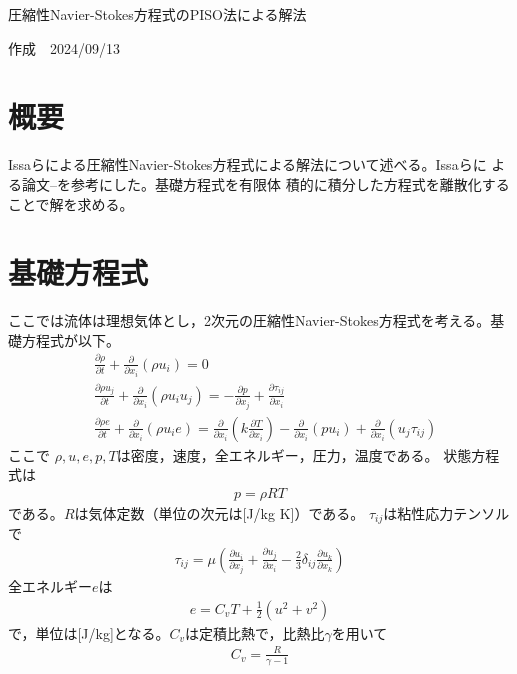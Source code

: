 \documentclass[a4paper,10pt,fleqn]{jsarticle}
\begin{document}

\begin{flushleft}
\begin{Large}
圧縮性Navier-Stokes方程式のPISO法による解法
\end{Large}
\end{flushleft}

\begin{flushright}
作成　2024/09/13\\
\end{flushright}

\section{概要}
Issaらによる圧縮性Navier-Stokes方程式による解法について述べる。Issaらに
よる論文\cite{Issa1991}--\cite{Issa1986}を参考にした。基礎方程式を有限体
積的に積分した方程式を離散化することで解を求める。

\section{基礎方程式}
ここでは流体は理想気体とし，2次元の圧縮性Navier-Stokes方程式を考える。基礎方程式が以下。
\begin{align}
& \frac{\partial \rho}{\partial t} + \frac{\partial}{\partial x_i}(\rho
 u_i) = 0 \label{eq:mass0}\\
& \frac{\partial \rho u_j}{\partial t} + \frac{\partial}{\partial x_i}(\rho
 u_i u_j) = -\frac{\partial p}{\partial x_j} + \frac{\partial
 \tau_{ij}}{\partial x_i} \label{eq:mom0}\\
& \frac{\partial \rho e}{\partial t} + \frac{\partial}{\partial x_i}(\rho
 u_i e) = \frac{\partial}{\partial x_i}\left(k\frac{\partial T}{\partial
 x_i}\right) - \frac{\partial}{\partial x_i}(pu_i) +
 \frac{\partial}{\partial x_i}(u_j \tau_{ij}) \label{eq:en0}
\end{align}
ここで
$\rho, u, e, p, T$は密度，速度，全エネルギー，圧力，温度である。
状態方程式は
\begin{align}
 p=\rho RT
\end{align}
である。$R$は気体定数（単位の次元は[J/kg K]）である。
$\tau_{ij}$は粘性応力テンソルで
\begin{align}
 \tau_{ij} = \mu\left(\frac{\partial u_i}{\partial x_j} + \frac{\partial
 u_j}{\partial x_i} -\frac{2}{3}\delta_{ij}\frac{\partial u_k}{\partial x_k}\right)
\end{align}
全エネルギー$e$は
\begin{align}
 e=C_vT+\frac{1}{2}(u^2+v^2)
\end{align}
で，単位は[J/kg]となる。$C_v$は定積比熱で，比熱比$\gamma$を用いて
\begin{align}
 C_v=\frac{R}{\gamma-1}
\end{align}
\end{document}
